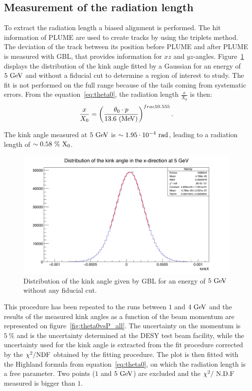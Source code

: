    \subsection{Measurement of the radiation length}

   To extract the radiation length a biased alignment is performed.
   The hit information of \gls{PLUME} are used to create tracks by using the triplets method.
   The deviation of the track between its position before \gls{PLUME} and after \gls{PLUME} is measured with \gls{GBL}, that provides information for $xz$ and $yz$-angles.
   Figure~\ref{fig:kinkAngle} displays the distribution of the kink angle fitted by a Gaussian for an energy of $5~\rm{GeV}$ and without a fiducial cut to determine a region of interest to study.
   The fit is not performed on the full range because of the tails coming from systematic errors.
   From the equation~\ref{eq:theta0}, the radiation length $\frac{x}{X_0}$ is then:
   \begin{equation}
     \frac{x}{X_{0}} = \left( \frac{\theta_0 \cdot p}{13.6~\rm{(MeV)}} \right)^{frac{1}{0.555}}.
   \end{equation}

   The kink angle measured at $5~\rm{GeV}$ is $\sim 1.95 \cdot 10^{-4}~\rm{rad}$, leading to a radiation length of $\sim 0.58~\%~\rm{X_0}$.
   
   \begin{figure}[!h]
     \centering
     \includegraphics[width = \textwidth]{Pictures/X0/kinkAngle5GeV.png}
     \caption{Distribution of the kink angle given by GBL for an energy of $5~\rm{GeV}$ without any fiducial cut.}
     \label{fig:kinkAngle}
   \end{figure} 
   
   This procedure has been repeated to the runs between $1$ and $4~\rm{GeV}$ and the results of the measured kink angles as a function of the beam momentum are represented on figure~\ref{fig:theta0vsP_all}. 
   The uncertainty on the momentum is $5~\%$ and is the uncertainty determined at the DESY test beam facility, while the uncertainty used for the kink angle is extracted from the fit procedure corrected by the $\chi^2 / \rm{NDF}$ obtained by the fitting procedure.
   The plot is then fitted with the Highland formula from equation~\ref{eq:theta0}, on which the radiation length is a free parameter.
   Two points ($1$ and $5~\rm{GeV}$) are excluded and the $\chi^2 /~\rm{N.D.F}$ measured is bigger than $1$.

